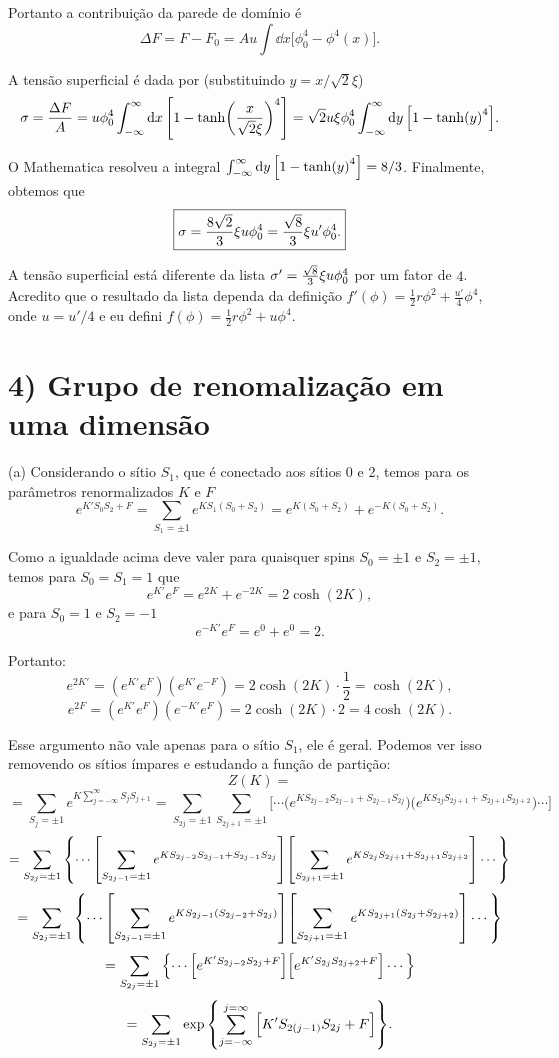 \documentclass[a4paper,10pt]{article}
\begin{document}
Portanto a contribuição da parede de domínio é
$$
\boxed{\Delta F = F - F_0 = Au \int \dd{x} \Big[\phi_0^4 - \phi^4(x)\Big].}
$$

\n

A tensão superficial é dada por (substituindo $y = x/\sqrt{2} \xi$)
$$
\sigma = \frac{\Delta F}{A} = u \phi_0^4 \int_{-\infty}^{\infty} \dd{x} \qty[1 - \tanh(\frac{x}{\sqrt{2} \xi})^4] =
\sqrt{2} u \xi \phi_0^4 \int_{-\infty}^{\infty} \dd{y} \qty[1 - \tanh(y)^4].
$$

O Mathematica resolveu a integral $\int_{-\infty}^{\infty} \dd{y} \qty[1 - \tanh(y)^4] = 8/3$. Finalmente, obtemos que
$$
\boxed{\sigma = \frac{8\sqrt{2}}{3} \xi u \phi_0^4 = \frac{\sqrt{8}}{3} \xi u' \phi_0^4.}
$$

A tensão superficial está diferente da lista $\sigma' = \frac{\sqrt{8}}{3} \xi u \phi_0^4$ por um fator de $4$. Acredito que o resultado da lista dependa da definição $f'(\phi) = \frac{1}{2} r\phi^2 + \frac{u'}{4} \phi^4$, onde $\boxed{u = u'/4}$ e eu defini $f(\phi) = \frac{1}{2} r\phi^2 + u \phi^4$.


\pagebreak


\section*{4) Grupo de renomalização em uma dimensão}

(a) Considerando o sítio $S_1$, que é conectado aos sítios 0 e 2, temos para os parâmetros renormalizados $K$ e $F$
$$
e^{K'S_0 S_2 + F} = \sum_{S_1 = \pm 1} e^{K S_1(S_0 + S_2)} = e^{K(S_0+S_2)} + e^{-K(S_0+S_2)}.
$$

Como a igualdade acima deve valer para quaisquer spins $S_0 = \pm 1$ e $S_2 = \pm 1$, temos para $S_0 = S_1 = 1$ que
$$
e^{K'} e^{F} = e^{2K} + e^{-2K} = 2 \cosh(2K),
$$
e para $S_0 = 1$ e $S_2 = -1$
$$
e^{-K'} e^{F} = e^0 + e^0 = 2.
$$

Portanto:
$$
\boxed{ e^{2K'} = (e^{K'}e^{F}) (e^{K'}e^{-F}) = 2 \cosh(2K) \cdot \frac{1}{2} = \cosh(2K), }
$$
$$
e^{2F} =  (e^{K'}e^{F}) (e^{-K'}e^{F}) = 2 \cosh(2K) \cdot 2 = 4 \cosh(2K).
$$

Esse argumento não vale apenas para o sítio $S_1$, ele é geral. Podemos ver isso removendo os sítios ímpares e estudando a função de partição:
$$
Z(K) =
$$
$$
= \sum_{S_j = \pm 1} e^{K \sum_{j=-\infty}^{\infty} S_j S_{j+1}}
= \sum_{S_{2j} = \pm 1} \sum_{S_{2j + 1} = \pm 1}
\Big[
\cdots
\Big( e^{K S_{2j-2} S_{2j-1} + S_{2j-1} S_{2j}} \Big)
\Big( e^{K S_{2j} S_{2j+1} + S_{2j+1} S_{2j+2}} \Big)
\cdots
\Big]
$$
$$
= \sum_{S_{2j} = \pm 1}
\qty{
\cdots
\qty[ \sum_{S_{2j-1} = \pm 1} e^{K S_{2j-2} S_{2j-1} + S_{2j-1} S_{2j}} ]
\qty[ \sum_{S_{2j+1} = \pm 1} e^{K S_{2j} S_{2j+1} + S_{2j+1} S_{2j+2}} ]
\cdots
}
$$
$$
= \sum_{S_{2j} = \pm 1}
\qty{
\cdots
\qty[ \sum_{S_{2j-1} = \pm 1} e^{K S_{2j-1} (S_{2j-2} + S_{2j})} ]
\qty[ \sum_{S_{2j+1} = \pm 1} e^{K S_{2j+1} (S_{2j} + S_{2j+2})} ]
\cdots
}
$$
$$
= \sum_{S_{2j} = \pm 1}
\qty{
\cdots
\Big[e^{K'S_{2j-2} S_{2j} + F}\Big]
\Big[e^{K'S_{2j} S_{2j+2} + F}\Big]
\cdots
}
$$
$$
= \sum_{S_{2j} = \pm 1} \exp\qty{ \sum_{j=-\infty}^{j=\infty} \Big[K' S_{2(j-1)}S_{2j} + F\Big] }.
$$
\end{document}
